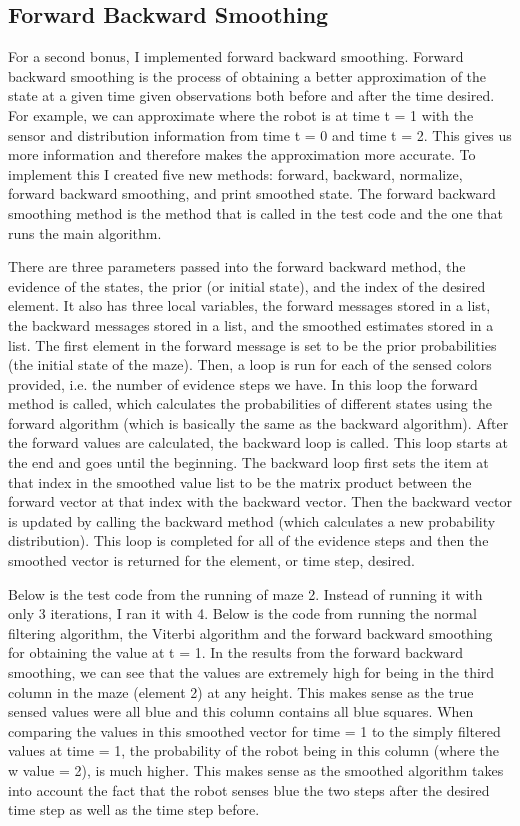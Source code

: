 \documentclass{article}
\begin{document}
\subsection{Forward Backward Smoothing}
For a second bonus, I implemented forward backward smoothing. Forward backward smoothing is the process of obtaining a better approximation of the state at a given time given observations both before and after the time desired. For example, we can approximate where the robot is at time t = 1 with the sensor and distribution information from time t = 0 and time t = 2. This gives us more information and therefore makes the approximation more accurate. To implement this I created five new methods: forward, backward, normalize, forward backward smoothing, and print smoothed state. The forward backward smoothing method is the method that is called in the test code and the one that runs the main algorithm. 

There are three parameters passed into the forward backward method, the evidence of the states, the prior (or initial state), and the index of the desired element. It also has three local variables, the forward messages stored in a list, the backward messages stored in a list, and the smoothed estimates stored in a list. The first element in the forward message is set to be the prior probabilities (the initial state of the maze). Then, a loop is run for each of the sensed colors provided, i.e. the number of evidence steps we have. In this loop the forward method is called, which calculates the probabilities of different states using the forward algorithm (which is basically the same as the backward algorithm). After the forward values are calculated, the backward loop is called. This loop starts at the end and goes until the beginning. The backward loop first sets the item at that index in the smoothed value list to be the matrix product between the forward vector at that index with the backward vector. Then the backward vector is updated by calling the backward method (which calculates a new probability distribution). This loop is completed for all of the evidence steps and then the smoothed vector is returned for the element, or time step, desired.

Below is the test code from the running of maze 2. Instead of running it with only 3 iterations, I ran it with 4. Below is the code from running the normal filtering algorithm, the Viterbi algorithm and the forward backward smoothing for obtaining the value at t = 1. In the results from the forward backward smoothing, we can see that the values are extremely high for being in the third column in the maze (element 2) at any height. This makes sense as the true sensed values were all blue and this column contains all blue squares. When comparing the values in this smoothed vector for time = 1 to the simply filtered values at time = 1, the probability of the robot being in this column (where the w value = 2), is much higher. This makes sense as the smoothed algorithm takes into account the fact that the robot senses blue the two steps after the desired time step as well as the time step before. 
\end{document}
